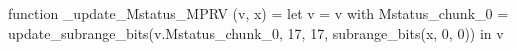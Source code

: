 function _update_Mstatus_MPRV (v, x) = let v = { v with Mstatus_chunk_0 = update_subrange_bits(v.Mstatus_chunk_0, 17, 17, subrange_bits(x, 0, 0)) } in
  v
